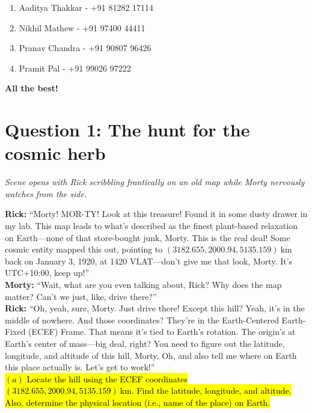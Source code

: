 \documentclass[a4paper, 12pt]{exam}
\begin{document}
		\begin{enumerate}
			\item Aaditya Thakkar - +91 81282 17114
			\item Nikhil Mathew - +91 97400 44411
			\item Pranav Chandra - +91 90807 96426
			\item Pramit Pal - +91 99026 97222
		\end{enumerate}

	\begin{center}
		\textbf{All the best!}
	\end{center}
		
	\pagebreak
	


\section*{Question 1: The hunt for the cosmic herb}

\noindent \textit{Scene opens with Rick scribbling frantically on an old map while Morty nervously watches from the side.}

\bigskip
\noindent \textbf{Rick:} “Morty! MOR-TY! Look at this treasure! Found it in some dusty drawer in my lab. This map leads to what’s described as the finest plant-based relaxation on Earth—none of that store-bought junk, Morty. This is the real deal! Some cosmic entity mapped this out, pointing to $(3182.655, 2000.94, 5135.159) \ \mathrm{km}$ back on January 3, 1920, at 1420 VLAT—don’t give me that look, Morty. It’s UTC+10:00, keep up!” \\

\noindent \textbf{Morty:} “Wait, what are you even talking about, Rick? Why does the map matter? Can’t we just, like, drive there?” \\

\noindent \textbf{Rick:} “Oh, yeah, sure, Morty. Just drive there! Except this hill? Yeah, it’s in the middle of nowhere. And those coordinates? They’re in the Earth-Centered Earth-Fixed (ECEF) Frame. That means it’s tied to Earth’s rotation. The origin’s at Earth’s center of mass—big deal, right? You need to figure out the latitude, longitude, and altitude of this hill, Morty. Oh, and also tell me where on Earth this place actually is. Let’s get to work!” \\

\hl{$(a)$ Locate the hill using the ECEF coordinates $(3182.655, 2000.94, 5135.159) \ \mathrm{km}$. Find the latitude, longitude, and altitude. Also, determine the physical location (i.e., name of the place) on Earth.}
\end{document}
